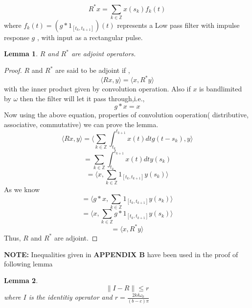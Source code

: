 \documentclass{article}
\newtheorem{lemma}{Lemma}[section]
\begin{document}
\begin{equation}
    R^*x = \sum_{k\in\mathbb{Z}}x(s_k)f_k(t)
\end{equation}
where $f_k(t) = (g*1_{[t_k,t_{k+1}]})(t)$ represents a Low pass filter with impulse response $g$ , with input as a rectangular pulse.\\
\begin{lemma}
$R$ and $R^*$ are adjoint operators.
\end{lemma}
\begin{proof}
$R$ and $R^*$ are said to be adjoint if ,
\begin{equation*}
    \langle Rx,y \rangle = \langle x,R^*y \rangle
\end{equation*}
with the inner product given by convolution operation.
Also if $x$ is bandlimited by $\omega$ then the filter will let it pass through,i.e.,\\
\begin{equation*}
    g*x = x 
\end{equation*}
Now using the above equation, properties of convolution ooperation( distributive, associative, commutative) we can prove the lemma. 
\[
    \langle Rx,y \rangle = \langle \sum_{k\in\mathbb{Z}}\int_{t_k}^{t_{k+1}}x(t)dt g(t-s_k),y \rangle
\]
\[
    = \sum_{k\in\mathbb{Z}}\int_{t_k}^{t_{k+1}}x(t)dt y(s_k)
\]
\[
    = \langle x , \sum_{k \in \mathbb{Z}}1_{[t_k,t_{k+1}]}y(s_k) \rangle
\]
As we know 
\[  
    = \langle g*x,\sum_{k\in\mathbb{Z}}1_{[t_k,t_{k+1}]}y(s_k)\rangle
\]
\[
    = \langle x,\sum_{k\in\mathbb{Z}}g*1_{[t_k,t_{k+1}]}y(s_k)\rangle
\]
\[  
    = \langle x,R^*y \rangle
\]
Thus, $R$ and $R^*$ are adjoint.
\end{proof}
\begin{flushleft}
\textbf{NOTE:} Inequalities given in \textbf{APPENDIX B} have been used in the proof of following lemma
\end{flushleft}
\begin{lemma}
\begin{equation}
    \|I - R\| \leq r
\end{equation}
where $I$ is the identitiy operator and $r = \frac{2k\delta\omega_0}{(b-c)\pi}$
\end{lemma}
\end{document}
